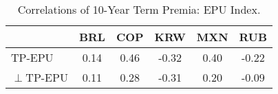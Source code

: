 \begin{tiny}\begin{table}\centering\begin{tabular}{l|ccccc}\toprule & BRL & COP & KRW & MXN & RUB \\\midrule TP-EPU & 0.14 & 0.46 & -0.32 & 0.40 & -0.22 \\$\perp$TP-EPU & 0.11 & 0.28 & -0.31 & 0.20 & -0.09 \\\bottomrule\end{tabular}\caption{Correlations of 10-Year Term Premia: EPU Index.}\label{tab:temp_tp_corr10yr_epu}\end{table}\end{tiny}